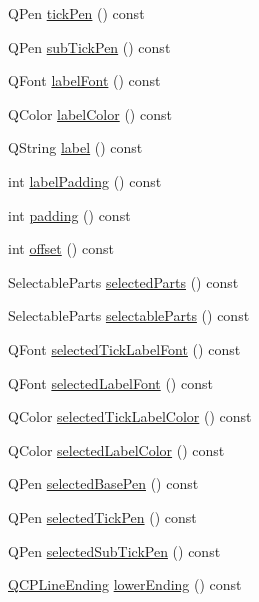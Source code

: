 \begin{DoxyCompactItemize}
Q\-Pen \hyperlink{class_q_c_p_axis_a5eb206da4265c6c083db71d692da3bc4}{tick\-Pen} () const 
\item 
Q\-Pen \hyperlink{class_q_c_p_axis_a2e8bce6dd03e393dbdf6bb427461a726}{sub\-Tick\-Pen} () const 
\item 
Q\-Font \hyperlink{class_q_c_p_axis_ae8029ae0b32e9d4d73dddcdd0a08c838}{label\-Font} () const 
\item 
Q\-Color \hyperlink{class_q_c_p_axis_a7854c2875e3b8d86b210d108bd87aeb9}{label\-Color} () const 
\item 
Q\-String \hyperlink{class_q_c_p_axis_ab3486dca5a6e9e3ca0e32678272ba549}{label} () const 
\item 
int \hyperlink{class_q_c_p_axis_a59c9a0e362dec811491fc9a0709d2afa}{label\-Padding} () const 
\item 
int \hyperlink{class_q_c_p_axis_abb85015a9467ec176e70698307ec833a}{padding} () const 
\item 
int \hyperlink{class_q_c_p_axis_aebc032ac6eea164a02859c017f52d5e7}{offset} () const 
\item 
Selectable\-Parts \hyperlink{class_q_c_p_axis_a08323248a1cba4750ef07ceea159e0b3}{selected\-Parts} () const 
\item 
Selectable\-Parts \hyperlink{class_q_c_p_axis_ad2bff3d2ed3d35c10d44c0c02441bd2c}{selectable\-Parts} () const 
\item 
Q\-Font \hyperlink{class_q_c_p_axis_ae245bb3dcd0ec71eee38437de6e719f7}{selected\-Tick\-Label\-Font} () const 
\item 
Q\-Font \hyperlink{class_q_c_p_axis_a078bbc88b33595a5308350c2889c96d4}{selected\-Label\-Font} () const 
\item 
Q\-Color \hyperlink{class_q_c_p_axis_a5a3af4bd1a820bb7c6d4c85e1d8d452f}{selected\-Tick\-Label\-Color} () const 
\item 
Q\-Color \hyperlink{class_q_c_p_axis_a8cf8de6ac7f1ca617e05412f669ed229}{selected\-Label\-Color} () const 
\item 
Q\-Pen \hyperlink{class_q_c_p_axis_a5a3919ad7b60c2789b04c7e72387cfd6}{selected\-Base\-Pen} () const 
\item 
Q\-Pen \hyperlink{class_q_c_p_axis_a9f86ef82e1d1a908ab4c68cfa5fe4175}{selected\-Tick\-Pen} () const 
\item 
Q\-Pen \hyperlink{class_q_c_p_axis_a1b264fdfef48c22aba36e76de7856784}{selected\-Sub\-Tick\-Pen} () const 
\item 
\hyperlink{class_q_c_p_line_ending}{Q\-C\-P\-Line\-Ending} \hyperlink{class_q_c_p_axis_ac85aebbedf67d7bc9e1e5c182151536b}{lower\-Ending} () const 

\end{DoxyCompactItemize}

